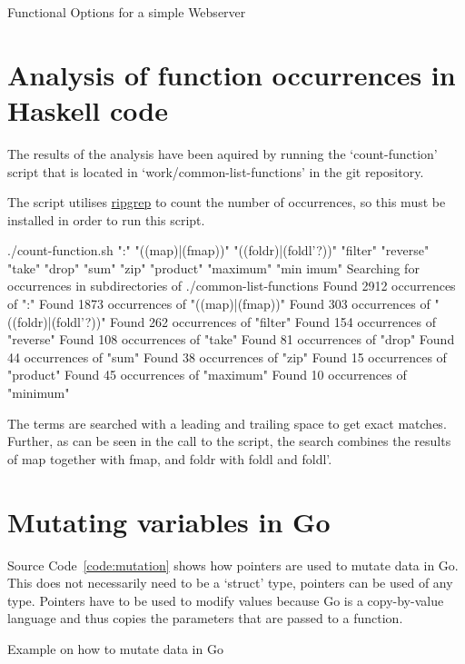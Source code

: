\begin{code}
    \caption{Functional Options for a simple Webserver}
\end{code}

\section{Analysis of function occurrences in Haskell code}\label{appendix:function-occurrences}
The results of the analysis have been aquired by running the `count-function' script
that is located in `work/common-list-functions' in the git repository\autocite{git-repo}.

The script utilises \href{https://github.com/BurntSushi/ripgrep}{ripgrep} to count the number of occurrences, so
this must be installed in order to run this script.

\begin{bashcode}
./count-function.sh ":" "((map)|(fmap))" "((foldr)|(foldl'?))" "filter" "reverse" "take" "drop" "sum" "zip" "product" "maximum" "min
imum"
Searching for occurrences in subdirectories of ./common-list-functions
Found 2912 occurrences of ":"
Found 1873 occurrences of "((map)|(fmap))"
Found 303 occurrences of "((foldr)|(foldl'?))"
Found 262 occurrences of "filter"
Found 154 occurrences of "reverse"
Found 108 occurrences of "take"
Found 81 occurrences of "drop"
Found 44 occurrences of "sum"
Found 38 occurrences of "zip"
Found 15 occurrences of "product"
Found 45 occurrences of "maximum"
Found 10 occurrences of "minimum"
\end{bashcode}

The terms are searched with a leading and trailing space to get exact matches. Further, as can be seen in
the call to the script, the search combines the results of map together with fmap, and foldr with foldl
and foldl'.

\section{Mutating variables in Go}\label{appendix:mutation}

Source Code~\ref{code:mutation} shows how pointers are used to mutate data in Go. This does
not necessarily need to be a `struct' type, pointers can be used of any type.
Pointers have to be used to modify values because Go is a copy-by-value language and thus
copies the parameters that are passed to a function.

\begin{code}
	\caption{Example on how to mutate data in Go}\label{code:mutation}
\end{code}


